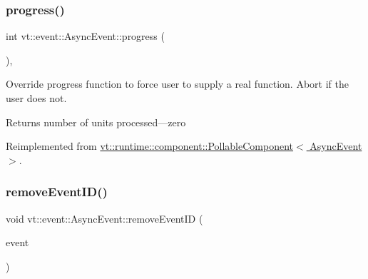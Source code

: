\mbox{\label{structvt_1_1event_1_1_async_event_a36f18429bc2856a30c8f7fd70654e0a4}} 
\subsubsection{\texorpdfstring{progress()}{progress()}}
{\footnotesize\ttfamily int vt\+::event\+::\+Async\+Event\+::progress (\begin{DoxyParamCaption}{ }\end{DoxyParamCaption})\hspace{0.3cm}{\ttfamily [override]}, {\ttfamily [virtual]}}



Override progress function to force user to supply a real function. Abort if the user does not. 

\begin{DoxyReturn}{Returns}
number of units processed---zero 
\end{DoxyReturn}


Reimplemented from \hyperlink{structvt_1_1runtime_1_1component_1_1_pollable_component_a34cad810026224d550cd9b0c9d1eff22}{vt\+::runtime\+::component\+::\+Pollable\+Component$<$ Async\+Event $>$}.

\mbox{\label{structvt_1_1event_1_1_async_event_a67a603eff81f5f912118f38fd5cbaccb}} 
\subsubsection{\texorpdfstring{remove\+Event\+I\+D()}{removeEventID()}}
{\footnotesize\ttfamily void vt\+::event\+::\+Async\+Event\+::remove\+Event\+ID (\begin{DoxyParamCaption}\item[{\hyperlink{namespacevt_a009267401def7ae8bf201892222d060f}{Event\+Type} const \&}]{event }\end{DoxyParamCaption})}

\mbox{\label{structvt_1_1event_1_1_async_event_ac14b4e2fc658f70937c591dfdc8ea083}} 
